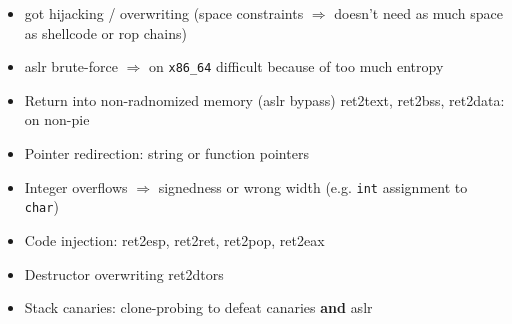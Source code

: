 \begin{itemize}
	\item{
		\gls{got} hijacking / overwriting (space constraints $\Rightarrow$ doesn't need as much space as shellcode or \gls{rop} chains) \cmark
	}
	\item{
		\gls{aslr} brute-force $\Rightarrow$ on \texttt{x86\_64} difficult because of too much entropy
	}
	\item{
		Return into non-radnomized memory (\gls{aslr} bypass) ret2text, ret2bss, ret2data: on non-\gls{pie}
	}
	\item{
		Pointer redirection: string or function pointers
	}
	\item{
		Integer overflows $\Rightarrow$ signedness or wrong width (e.g. \texttt{int} assignment to \texttt{char})
	}
	\item{
		Code injection: ret2esp, ret2ret, ret2pop, ret2eax
	}
	\item{
		Destructor overwriting ret2dtors
	}
	\item{
		Stack canaries: clone-probing to defeat canaries \textbf{and} \gls{aslr}
	}
\end{itemize}
